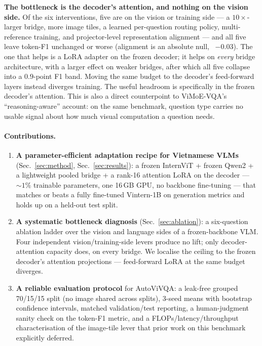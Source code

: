 \textbf{The bottleneck is the decoder's attention, and nothing on the vision
side.} Of the six interventions, five are on the vision or training side --- a
$10\times$-larger bridge, more image tiles, a learned per-question routing policy,
multi-reference training, and projector-level representation alignment --- and all
five leave token-F1 unchanged or worse (alignment is an absolute null,
\dF{}~$-0.03$). The one that helps is a LoRA adapter on the frozen decoder; it
helps on \emph{every} bridge architecture, with a larger effect on weaker
bridges, after which all five collapse into a $0.9$-point F1 band. Moving the same
budget to the decoder's feed-forward layers instead diverges training. The useful
headroom is specifically in the frozen decoder's attention. This is also a direct
counterpoint to ViMoE-VQA's ``reasoning-aware'' account: on the same benchmark,
question type carries no usable signal about how much visual computation a
question needs.

\paragraph{Contributions.}
\begin{enumerate}
\item \textbf{A parameter-efficient adaptation recipe for Vietnamese VLMs}
  (Sec.~\ref{sec:method}, Sec.~\ref{sec:results}): a frozen InternViT + frozen
  Qwen2 + a lightweight pooled bridge + a rank-16 attention LoRA on the decoder
  --- ${\sim}1\%$ trainable parameters, one 16\,GB GPU, no backbone fine-tuning
  --- that matches or beats a fully fine-tuned Vintern-1B on generation metrics
  and holds up on a held-out test split.
\item \textbf{A systematic bottleneck diagnosis} (Sec.~\ref{sec:ablation}): a
  six-question ablation ladder over the vision and language sides of a
  frozen-backbone VLM. Four independent vision/training-side levers produce no
  lift; only decoder-attention capacity does, on every bridge. We localise the
  ceiling to the frozen decoder's attention projections --- feed-forward LoRA at
  the same budget diverges.
\item \textbf{A reliable evaluation protocol} for AutoViVQA: a leak-free grouped
  70/15/15 split (no image shared across splits), 3-seed means with bootstrap
  confidence intervals, matched validation/test reporting, a human-judgment
  sanity check on the token-F1 metric, and a FLOPs/latency/throughput
  characterisation of the image-tile lever that prior work on this benchmark
  explicitly deferred.
\end{enumerate}
